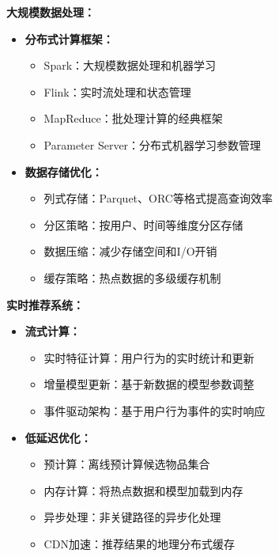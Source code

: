 \textbf{大规模数据处理：}
\begin{itemize}
\item \textbf{分布式计算框架：}
\begin{itemize}
\item Spark：大规模数据处理和机器学习
\item Flink：实时流处理和状态管理
\item MapReduce：批处理计算的经典框架
\item Parameter Server：分布式机器学习参数管理
\end{itemize}
\item \textbf{数据存储优化：}
\begin{itemize}
\item 列式存储：Parquet、ORC等格式提高查询效率
\item 分区策略：按用户、时间等维度分区存储
\item 数据压缩：减少存储空间和I/O开销
\item 缓存策略：热点数据的多级缓存机制
\end{itemize}
\end{itemize}

\textbf{实时推荐系统：}
\begin{itemize}
\item \textbf{流式计算：}
\begin{itemize}
\item 实时特征计算：用户行为的实时统计和更新
\item 增量模型更新：基于新数据的模型参数调整
\item 事件驱动架构：基于用户行为事件的实时响应
\end{itemize}
\item \textbf{低延迟优化：}
\begin{itemize}
\item 预计算：离线预计算候选物品集合
\item 内存计算：将热点数据和模型加载到内存
\item 异步处理：非关键路径的异步化处理
\item CDN加速：推荐结果的地理分布式缓存
\end{itemize}
\end{itemize}

